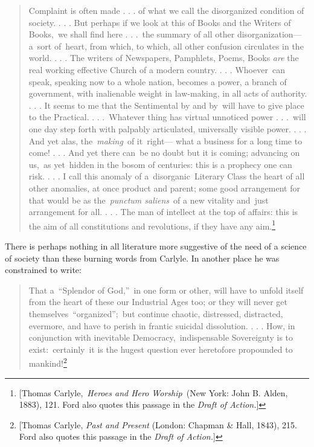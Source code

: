 \documentclass[twoside,symmetric,nobib,justified]{tufte-book}
\begin{document}
\begin{quote}
Complaint is often made . . . of what we call the disorganized condition
of society. . . . But perhaps if we look at this of Books and the
Writers of Books,~we shall find here . . .~the summary of all other
disorganization---a~sort of~heart, from which, to which, all other
confusion circulates in the world. . . . The writers of Newspapers,
Pamphlets, Poems, Books \emph{are} the real working effective Church of
a modern country. . . . Whoever~can speak, speaking now to a whole
nation, becomes a power, a branch of government, with inalienable weight
in law-making, in all acts of authority. . . . It seems to me that the
Sentimental by and by~will have to give place to the Practical. . .
.~Whatever thing has virtual unnoticed power . . .~will one day step
forth with palpably articulated, universally visible power. . . . And
yet alas, the~\emph{making}~of it~right--- what a business for a long
time to come! . . . And yet there can~be no doubt but it is coming;
advancing on us,~as yet~hidden in the bosom of centuries: this is a
prophecy one can risk. . . . I call this anomaly of
a~disorganic~Literary Class the heart of all other anomalies, at once
product and parent; some good arrangement for that would be as
the~\emph{punctum saliens}~of a new vitality and~just arrangement for
all. . . . The man of intellect at the top of affairs: this is the aim
of all constitutions and revolutions, if they have any aim.\footnote{{[}Thomas
  Carlyle,~\emph{Heroes and Hero Worship~}(New York: John B. Alden,
  1883), 121. Ford also quotes this passage in the \emph{Draft of
  Action.}{]}}~
\end{quote}
There is perhaps nothing in all literature more suggestive of the need
of a science of society than these burning words from Carlyle. In another place he was constrained to write:~
\enlargethispage{-\baselineskip}
\begin{quote}
That a~``Splendor of God,''~in one form or other, will have to unfold
itself from the heart of these our Industrial Ages too; or they will
never get themselves~``organized'';~but continue chaotic, distressed,
distracted, evermore, and have to perish in frantic suicidal
dissolution. . . . How, in conjunction with inevitable
Democracy,~indispensable Sovereignty is to exist:~certainly~it is the
hugest question ever heretofore propounded to mankind!\footnote{{[}Thomas
  Carlyle, \emph{Past and Present} (London: Chapman \& Hall, 1843), 215.
  Ford also quotes this passage in the \emph{Draft of Action.}{]}}~
\end{quote}
\end{document}
